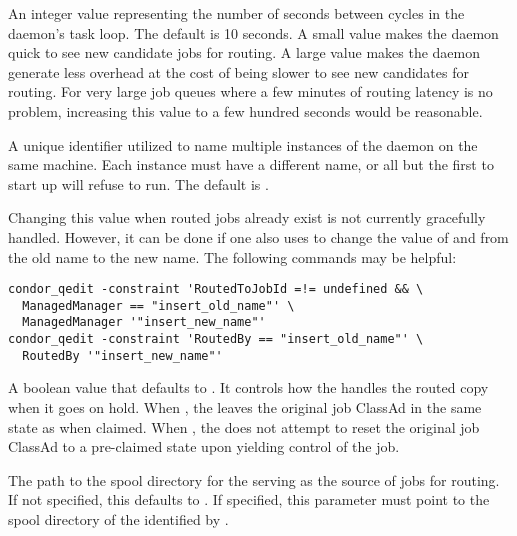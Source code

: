 \begin{description}
\label{param:JobRouterPollingPeriod}
\item[\Macro{JOB\_ROUTER\_POLLING\_PERIOD}]
  An integer value representing the number of seconds
  between cycles in the  daemon's task loop.
  The default is 10 seconds.
  A small value makes the  daemon 
  quick to see new candidate jobs for routing.
  A large value makes the  daemon generate less
  overhead at the cost of being slower to see new candidates for routing.
  For very large job queues where a few minutes of
  routing latency is no problem, increasing this value to a few
  hundred seconds would be reasonable.

\label{param:JobRouterName}
\item[\Macro{JOB\_ROUTER\_NAME}]
  A unique identifier utilized to name multiple instances of
  the  daemon on the same machine.
  Each instance must have a different name,
  or all but the first to start up will refuse to run.
  The default is .

  Changing this value when routed jobs already exist is not currently
  gracefully handled.  However, it can be done if one also uses
   to change the value of  and
   from the old name to the new name.  The following commands
  may be helpful:

\begin{verbatim}
condor_qedit -constraint 'RoutedToJobId =!= undefined && \
  ManagedManager == "insert_old_name"' \
  ManagedManager '"insert_new_name"'
condor_qedit -constraint 'RoutedBy == "insert_old_name"' \
  RoutedBy '"insert_new_name"'
\end{verbatim}

\label{param:JobRouterReleaseOnHold}
\item[\Macro{JOB\_ROUTER\_RELEASE\_ON\_HOLD}]
  A boolean value that defaults to .
  It controls how the  handles the routed copy when it
  goes on hold.
  When \Expr{True}, the  leaves the original job 
  ClassAd in the same state as when claimed.  When \Expr{False},
  the \Condor{job\_router} does not attempt to reset the original job
  ClassAd to a pre-claimed state upon yielding control of the job.

\label{param:JobRouterSchedd1Spool}
\item[\Macro{JOB\_ROUTER\_SCHEDD1\_SPOOL}]
  The path to the spool directory for the  serving as the
  source of jobs for routing.  If not specified, this defaults to
  \MacroUNI{SPOOL}.  
  If specified, this parameter must point to the spool directory of 
  the \Condor{schedd} identified by .


\end{description}
